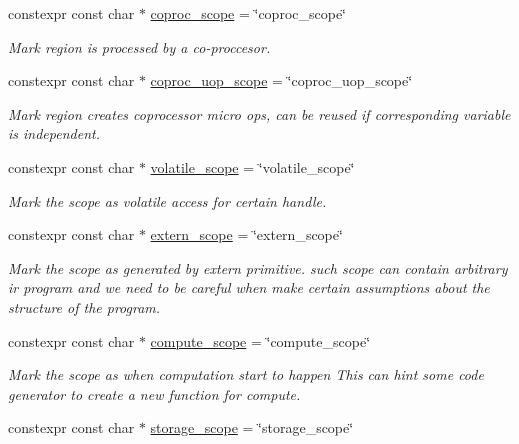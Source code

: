 \begin{DoxyCompactItemize}
constexpr const char $\ast$ \hyperlink{namespacetvm_1_1tir_1_1attr_ac62a341bfebe5448f290aa54b0f84cac}{coproc\+\_\+scope} = \char`\"{}coproc\+\_\+scope\char`\"{}
\begin{DoxyCompactList}\small\item\em Mark region is processed by a co-\/proccesor. \end{DoxyCompactList}\item 
constexpr const char $\ast$ \hyperlink{namespacetvm_1_1tir_1_1attr_ae1d3379e8d6486e79853e254ea9a724e}{coproc\+\_\+uop\+\_\+scope} = \char`\"{}coproc\+\_\+uop\+\_\+scope\char`\"{}
\begin{DoxyCompactList}\small\item\em Mark region creates coprocessor micro ops, can be reused if corresponding variable is independent. \end{DoxyCompactList}\item 
constexpr const char $\ast$ \hyperlink{namespacetvm_1_1tir_1_1attr_a14c2370f3a08792a6aaf70d7a3c773e4}{volatile\+\_\+scope} = \char`\"{}volatile\+\_\+scope\char`\"{}
\begin{DoxyCompactList}\small\item\em Mark the scope as volatile access for certain handle. \end{DoxyCompactList}\item 
constexpr const char $\ast$ \hyperlink{namespacetvm_1_1tir_1_1attr_a4bd38b620e1e9907216f3e583839dea3}{extern\+\_\+scope} = \char`\"{}extern\+\_\+scope\char`\"{}
\begin{DoxyCompactList}\small\item\em Mark the scope as generated by extern primitive. such scope can contain arbitrary ir program and we need to be careful when make certain assumptions about the structure of the program. \end{DoxyCompactList}\item 
constexpr const char $\ast$ \hyperlink{namespacetvm_1_1tir_1_1attr_a00a6b89838348f152d844cead81b5016}{compute\+\_\+scope} = \char`\"{}compute\+\_\+scope\char`\"{}
\begin{DoxyCompactList}\small\item\em Mark the scope as when computation start to happen This can hint some code generator to create a new function for compute. \end{DoxyCompactList}\item 
constexpr const char $\ast$ \hyperlink{namespacetvm_1_1tir_1_1attr_a04f015503117e6b781ade61e103b074a}{storage\+\_\+scope} = \char`\"{}storage\+\_\+scope\char`\"{}

\end{DoxyCompactItemize}
